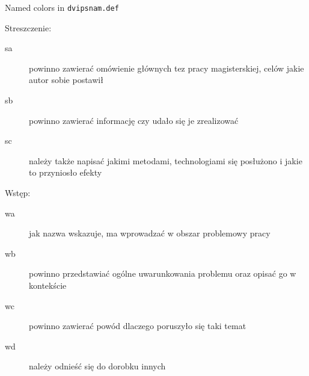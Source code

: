 \documentclass[12pt,a4paper]{article}
\begin{document}
\renewcommand*{\DefineNamedColor}[4]{%
  \textcolor[named]{#2}{\rule{7mm}{7mm}}\quad
  \texttt{#2}\strut\\}

\begin{center}
  \Large Named colors in \texttt{dvipsnam.def}
\end{center}

\begin{multicols}{3}

\end{multicols}

\newpage

Streszczenie:

\begin{description}
\item[sa] \textcolor{sa}{powinno zawierać omówienie głównych tez pracy magisterskiej, celów jakie autor sobie postawił}
\item[sb] \textcolor{sb}{powinno zawierać informację czy udało się je zrealizować}
\item[sc] \textcolor{sc}{należy także napisać jakimi metodami, technologiami się posłużono i jakie to przyniosło efekty}
\end{description}


Wstęp:

\begin{description}
\item[wa] \textcolor{wa}{jak nazwa wskazuje, ma wprowadzać w obszar problemowy pracy}
\item[wb] \textcolor{wb}{powinno przedstawiać ogólne uwarunkowania problemu oraz opisać go w kontekście}
\item[wc] \textcolor{wc}{powinno zawierać powód dlaczego poruszyło się taki temat}
\item[wd] \textcolor{wd}{należy odnieść się do dorobku innych}
\end{description}
\end{document}
